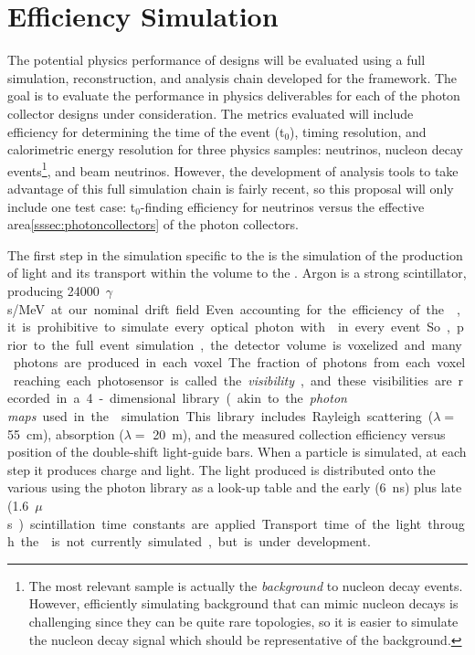 \section{ Efficiency Simulation}
\label{sec:fdsp-pd-simphys}

The potential physics performance of  designs will be evaluated using a full simulation, reconstruction, and analysis chain developed for the \larsoft framework. The goal is to evaluate the performance in physics deliverables for each of the photon collector designs under consideration. The metrics evaluated will include efficiency for determining the time of the event (t$_0$), timing resolution, and calorimetric energy resolution for three physics samples:  neutrinos, nucleon decay events\footnote{The most relevant sample is actually the \emph{background} to nucleon decay events. However, efficiently simulating background that can mimic nucleon decays is challenging since they can be quite rare topologies, so it is easier to simulate the nucleon decay signal which should be representative of the background.}, and beam neutrinos. However, the development of analysis tools to take advantage of this full simulation chain is fairly recent, so this proposal will only include one test case: t$_0$-finding efficiency for  neutrinos versus the effective area\ref{sssec:photoncollectors} of the photon collectors.

The first step in the simulation specific to the  is the simulation of the production of light and its transport within the volume to the . Argon is a strong scintillator, producing \SI{24000}{$\gamma$s/MeV} at our nominal drift field. Even accounting for the efficiency of the , it is prohibitive to simulate every optical photon with  in every event. So, prior to the full event simulation, the detector volume is voxelized and many photons are produced in each voxel. The fraction of photons from each voxel reaching each photosensor is called the \textit{visibility}, and these visibilities are recorded in a 4-dimensional library (akin to the \textit{photon maps} used in the  simulation.
This library includes Rayleigh scattering ($\lambda=$ \SI{55}{cm}\cite{Grace:2015yta}), absorption ($\lambda=$ \SI{20}{m}), and the measured collection efficiency versus position of the double-shift light-guide bars. When a particle is simulated, at each step it produces charge and light. The light produced is distributed onto the various  using the photon library as a look-up table and the early (\SI{6}{ns}) plus late (\SI{1.6}{$\mu$s}) scintillation time constants are applied. Transport time of the light through the \lar is not currently simulated, but is under development.

